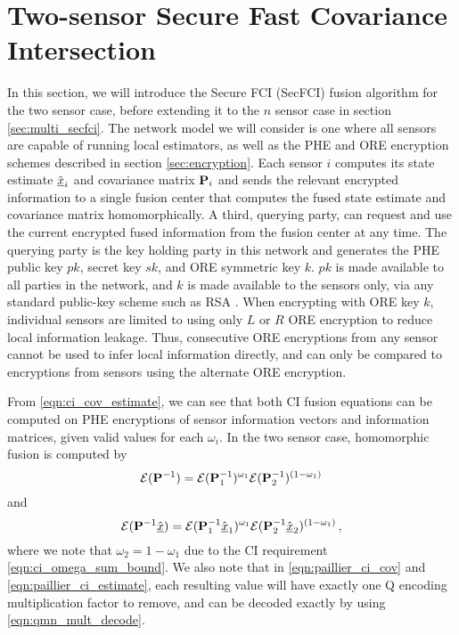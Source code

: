 \documentclass[letterpaper, 10 pt, conference]{ieeeconf}  %
\begin{document}
\section{Two-sensor Secure Fast Covariance Intersection} \label{sec:secfci}
In this section, we will introduce the Secure FCI (SecFCI) fusion algorithm for the two sensor case, before extending it to the $n$ sensor case in section \ref{sec:multi_secfci}. The network model we will consider is one where all sensors are capable of running local estimators, as well as the PHE and ORE encryption schemes described in section \ref{sec:encryption}. Each sensor $i$ computes its state estimate $\hat{{\underline{x}}}_i$ and covariance matrix ${{\mathbf{P}}}_i$ and sends the relevant encrypted information to a single fusion center that computes the fused state estimate and covariance matrix homomorphically. A third, querying party, can request and use the current encrypted fused information from the fusion center at any time. The querying party is the key holding party in this network and generates the PHE public key $pk$, secret key $sk$, and ORE symmetric key $k$. $pk$ is made available to all parties in the network, and $k$ is made available to the sensors only, via any standard public-key scheme such as RSA \cite{rivestMethodObtainingDigital1978}. When encrypting with ORE key $k$, individual sensors are limited to using only $L$ or $R$ ORE encryption to reduce local information leakage. Thus, consecutive ORE encryptions from any sensor cannot be used to infer local information directly, and can only be compared to encryptions from sensors using the alternate ORE encryption.

From \eqref{eqn:ci_cov_estimate}, we can see that both CI fusion equations can be computed on PHE encryptions of sensor information vectors and information matrices, given valid values for each $\omega_i$. In the two sensor case, homomorphic fusion is computed by
\begin{equation}
   \mathcal{E}({{\mathbf{P}}}^{-1}) = \mathcal{E}({{\mathbf{P}}}^{-1}_1)^{\omega_1}\mathcal{E}({{\mathbf{P}}}^{-1}_2)^{(1 -\omega_1)} \label{eqn:paillier_ci_cov}
\end{equation}
and
\begin{equation}
   \mathcal{E}({{\mathbf{P}}}^{-1}\hat{{\underline{x}}}) = \mathcal{E}({{\mathbf{P}}}^{-1}_1\hat{{\underline{x}}}_1)^{\omega_1}\mathcal{E}({{\mathbf{P}}}^{-1}_2\hat{{\underline{x}}}_2)^{(1 - \omega_1)}\,, \label{eqn:paillier_ci_estimate}
\end{equation}
where we note that $\omega_2=1-\omega_1$ due to the CI requirement \eqref{eqn:ci_omega_sum_bound}. We also note that in \eqref{eqn:paillier_ci_cov} and \eqref{eqn:paillier_ci_estimate}, each resulting value will have exactly one Q encoding multiplication factor to remove, and can be decoded exactly by using \eqref{eqn:qmn_mult_decode}.
\end{document}
